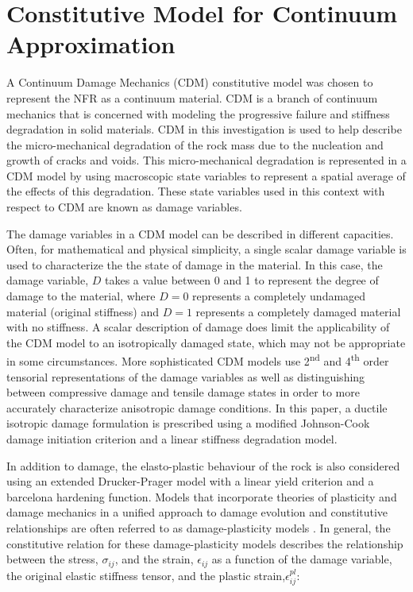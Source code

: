 \section{Constitutive Model for Continuum Approximation}

A Continuum Damage Mechanics (CDM) constitutive model was chosen to represent the NFR as a continuum material. CDM is a branch of continuum mechanics that is concerned with modeling the progressive failure and stiffness degradation in solid materials. CDM in this investigation is used to help describe the micro-mechanical degradation of the rock mass due to the nucleation and growth of cracks and voids. This micro-mechanical degradation is represented in a CDM model by using macroscopic state variables to represent a spatial average of the effects of this degradation. These state variables used in this context with respect to CDM are known as damage variables. 

The damage variables in a CDM model can be described in different capacities. Often, for mathematical and physical simplicity, a single scalar damage variable is used to characterize the the state of damage in the material. In this case, the damage variable, $D$ takes a value between 0 and 1 to represent the degree of damage to the material, where $D=0$ represents a completely undamaged material (original stiffness) and $D=1$ represents a completely damaged material with no stiffness. A scalar description of damage does limit the applicability of the CDM model to an isotropically damaged state, which may not be appropriate in some circumstances. More sophisticated CDM models use 2\textsuperscript{nd} and 4\textsuperscript{th} order tensorial representations of the damage variables as well as distinguishing between compressive damage and tensile damage states in order to more accurately characterize anisotropic damage conditions. In this paper, a ductile isotropic damage formulation is prescribed using a modified Johnson-Cook damage initiation criterion and a linear stiffness degradation model.

In addition to damage, the elasto-plastic behaviour of the rock is also considered using an extended Drucker-Prager model with a linear yield criterion and a barcelona hardening function. Models that incorporate theories of plasticity and damage mechanics in a unified approach to damage evolution and constitutive relationships are often referred to as damage-plasticity models \cite{zhang_continuum_2010}. In general, the constitutive relation for these damage-plasticity models describes the relationship between the stress, $\sigma_{ij}$, and the strain, $\epsilon_{ij}$ as a function of the damage variable, the original elastic stiffness tensor, and the plastic strain,$\epsilon^{pl}_{ij}$: 

